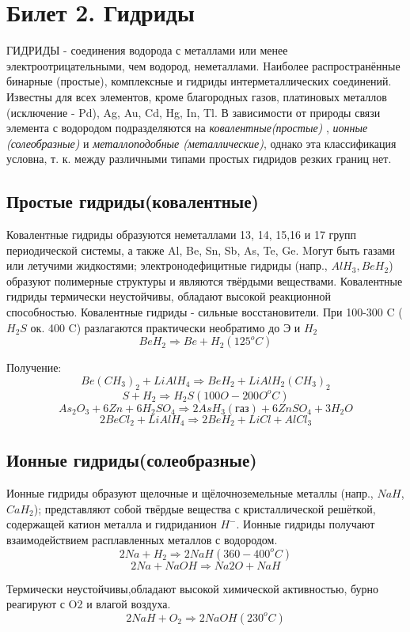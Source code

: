 \documentclass[11pt]{article}
\begin{document}
\section{Билет 2. Гидриды}

ГИДРИДЫ - соединения водорода с металлами или менее электроотрицательными, чем водород,
неметаллами. Hаиболее распространённые бинарные (простые), комплексные и гидриды
интерметаллических соединений. Известны для всех элементов, кроме благородных газов,
платиновых металлов (исключение - Pd), Ag, Au, Cd, Hg, In, Tl. В зависимости от природы связи
элемента с водородом подразделяются на \emph{ковалентные(простые)} , \emph{ионные (солеобразные)} и
\emph{металлоподобные (металлические)}, однако эта классификация условна, т. к. между различными
типами простых гидридов резких границ нет.

\subsection{Простые гидриды(ковалентные)}
Ковалентные гидриды образуются неметаллами 13, 14, 15,16 и 17 групп периодической системы, а
также Al, Be, Sn, Sb, As, Te, Ge. Mогут быть газами или летучими жидкостями; электронодефицитные
гидриды (напр., $AlH_3, BeH_2$) образуют полимерные структуры и являются твёрдыми веществами.
Ковалентные гидриды термически неустойчивы, обладают высокой реакционной способностью.
Ковалентные гидриды - сильные восстановители.
При 100-300 C ($H_2S$ ок. 400 C) разлагаются практически необратимо до Э и $H_2$ 
$$BeH_2 \Rightarrow Be + H_2 (125^oC)$$

Получение:
$$Be(CH_3)_2 + LiAlH_4 \Rightarrow BeH_2 + LiAlH_2(CH_3)_2$$
$$S +H_2 \Rightarrow H_2S (100O - 200O ^o C)$$
$$As_2O_3 + 6Zn + 6H_2SO_4 \Rightarrow 2AsH_3(газ) + 6ZnSO_4 + 3H_2O$$
$$2BeCl_2 + LiAlH_4 \Rightarrow 2BeH_2 + LiCl + AlCl_3$$

\subsection{Ионные гидриды(солеобразные)}

Ионные гидриды образуют щелочные и щёлочноземельные металлы (напр., $NaH$, $CaH_2$);
представляют собой твёрдые вещества с кристаллической решёткой, содержащей катион металла и
гидриданион $H^{-}$. Ионные гидриды получают взаимодействием расплавленных металлов с
водородом.
$$2Na + H_2 \Rightarrow 2NaH (360 - 400^o C)$$
$$ 2Na + NaOH \Rightarrow Na2O + NaH$$

Термически неустойчивы,обладают высокой химической активностью, бурно реагируют с O2 и
влагой воздуха. $$2NaH + O_2 \Rightarrow 2NaOH (230 ^o C)$$
\end{document}
